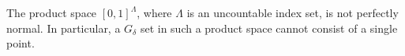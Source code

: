 The product space $[0,1]^\Lambda$, where $\Lambda$ is an uncountable index set, is not perfectly normal. In particular, a $G_\delta$ set in such a product space cannot consist of a single point.
